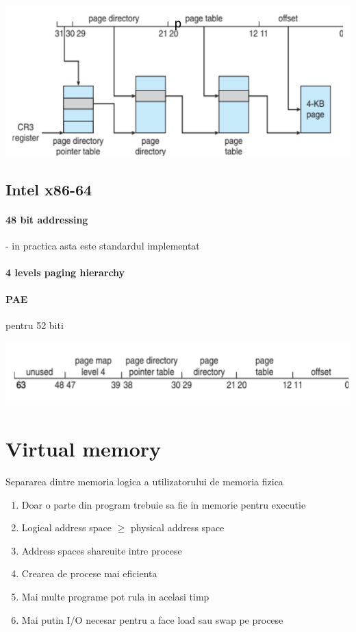\documentclass{article}
\begin{document}
\begin{center}
    \includegraphics[scale=0.3]{28-32paemem.png}
\end{center}

\subsection*{Intel x86-64}
\paragraph*{48 bit addressing} - in practica asta este standardul implementat
\paragraph*{4 levels paging hierarchy}
\paragraph*{PAE} pentru 52 biti
\begin{center}
    \includegraphics[scale=0.3]{29-64mem.png}
\end{center}


\section[Ch10 Virtual memory]{Virtual memory}
Separarea dintre memoria logica a utilizatorului de memoria fizica
\begin{enumerate}
    \item Doar o parte din program trebuie sa fie in memorie pentru executie
    \item Logical address space $\geq$ physical address space
    \item Address spaces shareuite intre procese
    \item Crearea de procese mai eficienta
    \item Mai multe programe pot rula in acelasi timp
    \item Mai putin I/O necesar pentru a face load sau swap pe procese
\end{enumerate}
\end{document}
